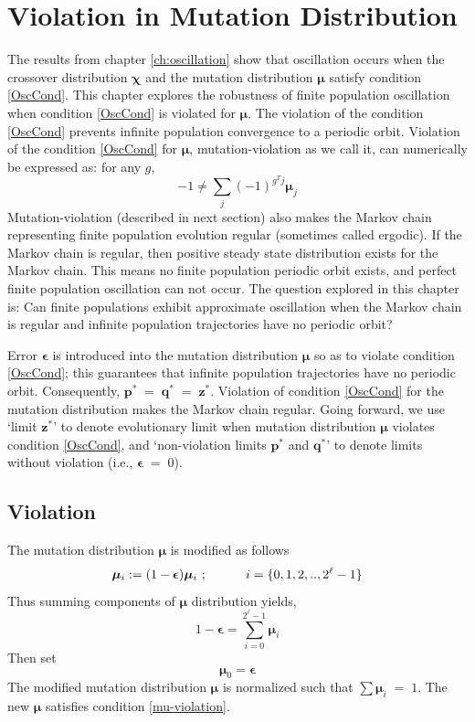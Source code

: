 \chapter{Violation in Mutation Distribution} \label{ch:muviolation}
The results from chapter \ref{ch:oscillation} show that oscillation occurs
when the crossover distribution $\bm{\chi}$ and the mutation distribution $\bm{\mu}$ 
satisfy condition \ref{OscCond}. This chapter explores the robustness of 
finite population oscillation when condition \ref{OscCond} is violated for $\bm{\mu}$. 
The violation of the condition \ref{OscCond} prevents 
infinite population convergence to a periodic orbit. 
Violation of the condition \ref{OscCond} for $\bm{\mu}$, mutation-violation as we call it, 
can numerically be expressed as:\newline  
for any $g$,
\begin{equation}
\label{mu-violation}
  -1 \neq \sum \limits_{j} (-1)^{g^T j} \bm{\mu}_j  
\end{equation}
Mutation-violation (described in next section) also makes 
the Markov chain representing finite population evolution regular 
(sometimes called ergodic). If the Markov chain is regular, 
then positive steady state distribution exists for the Markov chain. 
This means no finite population periodic orbit exists, 
and perfect finite population oscillation can not occur. 
The question explored in this chapter is: Can finite populations exhibit approximate oscillation when the
Markov chain is regular and infinite population trajectories
have no periodic orbit?

Error $\bm{\epsilon}$ is introduced into the mutation distribution $\bm{\mu}$ so as to 
violate condition \ref{OscCond}; this guarantees that 
infinite population trajectories have no periodic orbit. Consequently, $\bm{p}^\ast \;=\; \bm{q}^\ast \;=\; \bm{z}^\ast$. 
Violation of condition \ref{OscCond} for the mutation distribution makes the Markov chain regular. 
Going forward, we use `limit $\bm{z}^\ast$' to denote evolutionary limit when mutation distribution $\bm{\mu}$ 
violates condition \ref{OscCond}, and 
`non-violation limits $\bm{p}^\ast$ and $\bm{q}^\ast$' to denote limits without violation (i.e., $\bm{\epsilon} \;=\; 0$).

\section{Violation}
The mutation distribution $\bm{\mu}$ is modified as follows
\[
\bm{\mu}_i := (1-\bm{\epsilon}) \bm{\mu}_i \hspace{0.01in}\;; \hspace{30pt} i = \{0, 1, 2,.., 2^{\ell}-1\}
\]
Thus summing components of $\bm{\mu}$ distribution yields, 
\[
1-\bm{\epsilon} = \sum \limits_{i=0}^{2^{\ell}-1} \bm{\mu}_i
\]
Then set
\[
\bm{\mu}_0 = \bm{\epsilon}
\]
The modified mutation distribution $\bm{\mu}$ is normalized such that  $\sum \bm{\mu}_i \;=\; 1$.
The new $\bm{\mu}$ satisfies condition \ref{mu-violation}.

